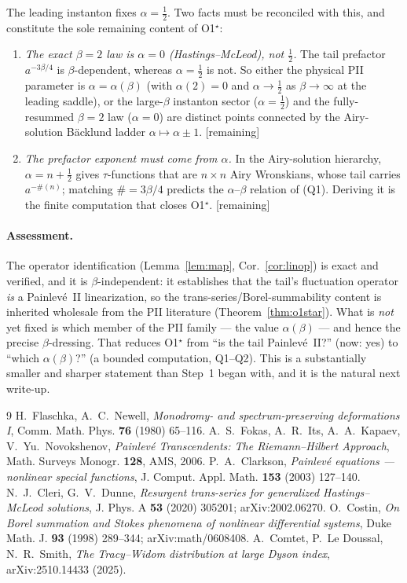 \documentclass[11pt,reqno]{amsart}
\theoremstyle{plain}
\theoremstyle{remark}
\newcommand{\gap}{{\footnotesize\textsf{[remaining]}}}
\begin{document}
The leading instanton fixes $\alpha=\tfrac12$. Two facts must be reconciled with this, and
constitute the sole remaining content of O1$^\star$:
\begin{enumerate}
\item[(Q1)] \emph{The exact $\beta=2$ law is $\alpha=0$ (Hastings--McLeod), not $\tfrac12$.} The
tail prefactor $a^{-3\beta/4}$ is $\beta$-dependent, whereas $\alpha=\tfrac12$ is not. So either the
physical PII parameter is $\alpha=\alpha(\beta)$ (with $\alpha(2)=0$ and $\alpha\to\tfrac12$ as
$\beta\to\infty$ at the leading saddle), or the large-$\beta$ instanton sector ($\alpha=\tfrac12$)
and the fully-resummed $\beta=2$ law ($\alpha=0$) are distinct points connected by the Airy-solution
B\"acklund ladder $\alpha\mapsto\alpha\pm1$. \gap
\item[(Q2)] \emph{The prefactor exponent must come from $\alpha$.} In the Airy-solution hierarchy,
$\alpha=n+\tfrac12$ gives $\tau$-functions that are $n\times n$ Airy Wronskians, whose tail carries
$a^{-\#(n)}$; matching $\#=3\beta/4$ predicts the $\alpha$--$\beta$ relation of (Q1). Deriving it is
the finite computation that closes O1$^\star$. \gap
\end{enumerate}

\paragraph{Assessment.} The operator identification (Lemma~\ref{lem:map}, Cor.~\ref{cor:linop}) is
exact and verified, and it is $\beta$-independent: it establishes that the tail's fluctuation
operator \emph{is} a Painlev\'e~II linearization, so the trans-series/Borel-summability content is
inherited wholesale from the PII literature (Theorem~\ref{thm:o1star}). What is \emph{not} yet fixed
is which member of the PII family --- the value $\alpha(\beta)$ --- and hence the precise
$\beta$-dressing. That reduces O1$^\star$ from ``is the tail Painlev\'e~II?'' (now: yes) to ``which
$\alpha(\beta)$?'' (a bounded computation, Q1--Q2). This is a substantially smaller and sharper
statement than Step~1 began with, and it is the natural next write-up.

\begin{thebibliography}{9}
 H.~Flaschka, A.~C.~Newell, \emph{Monodromy- and spectrum-preserving deformations
I}, Comm. Math. Phys. \textbf{76} (1980) 65--116.
 A.~S.~Fokas, A.~R.~Its, A.~A.~Kapaev, V.~Yu.~Novokshenov, \emph{Painlev\'e
Transcendents: The Riemann--Hilbert Approach}, Math. Surveys Monogr. \textbf{128}, AMS, 2006.
 P.~A.~Clarkson, \emph{Painlev\'e equations --- nonlinear special functions},
J. Comput. Appl. Math. \textbf{153} (2003) 127--140.
 N.~J.~Cleri, G.~V.~Dunne, \emph{Resurgent trans-series for generalized
Hastings--McLeod solutions}, J. Phys. A \textbf{53} (2020) 305201; arXiv:2002.06270.
 O.~Costin, \emph{On Borel summation and Stokes phenomena of nonlinear
differential systems}, Duke Math. J. \textbf{93} (1998) 289--344; arXiv:math/0608408.
 A.~Comtet, P.~Le Doussal, N.~R.~Smith, \emph{The Tracy--Widom distribution at large
Dyson index}, arXiv:2510.14433 (2025).
\end{thebibliography}
\end{document}

